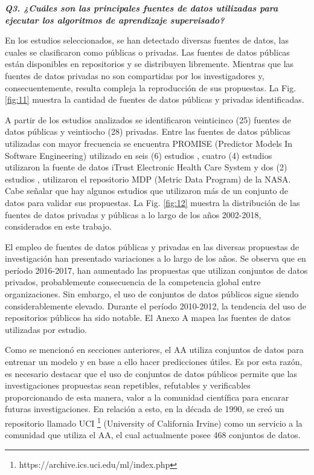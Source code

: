\documentclass[journal]{IEEEtran}
\begin{document}
\emph{\textbf{Q3. ¿Cuáles son las principales fuentes de datos utilizadas para ejecutar los algoritmos de aprendizaje supervisado?} } 

En los estudios seleccionados, se han detectado diversas fuentes de datos, las cuales se clasificaron como públicas o privadas. Las fuentes de datos públicas están disponibles en repositorios y se distribuyen libremente. Mientras que las fuentes de datos privadas no son compartidas por los investigadores y, consecuentemente, resulta compleja la reproducción de sus propuestas. La Fig. \ref{fig:11} muestra la cantidad de fuentes de datos públicas y privadas identificadas.

A partir de los estudios analizados se identificaron veinticinco (25) fuentes de datos públicas y veintiocho (28) privadas. Entre las fuentes de datos públicas utilizadas con mayor frecuencia se encuentra PROMISE (Predictor Models In Software Engineering) utilizado en seis (6) estudios \cite{Jindal20162027,dekhtyar2017re,abad2017works,Slankas2013,fitzgerald2012early,malhotra2017exploratory}, cuatro (4) estudios utilizaron la fuente de datos iTrust Electronic Health Care System \cite{Slankas2013,Slankas2013a,winkler2016automatic,sharma2014automated} y dos (2) estudios \cite{fitzgerald2012early}, \cite{malhotra2017exploratory} utilizaron el repositorio MDP (Metric Data Program) de la NASA. Cabe señalar que hay algunos estudios que utilizaron más de un conjunto de datos para validar sus propuestas. La Fig. \ref{fig:12} muestra la distribución de las fuentes de datos privadas y públicas a lo largo de los años 2002-2018, considerados en este trabajo.

El empleo de fuentes de datos públicas y privadas en las diversas propuestas de investigación han presentado variaciones a lo largo de los años. Se observa que en período 2016-2017, han aumentado las propuestas que utilizan conjuntos de datos privados, probablemente consecuencia de la competencia global entre organizaciones. Sin embargo, el uso de conjuntos de datos públicos sigue siendo considerablemente elevado. Durante el período 2010-2012, la tendencia del uso de repositorios públicos ha sido notable. El Anexo A mapea las fuentes de datos utilizadas por estudio.

Como se mencionó en secciones anteriores, el AA utiliza conjuntos de datos para entrenar un modelo y en base a ello hacer predicciones útiles. Es por esta razón, es necesario destacar que el uso de conjuntos de datos públicos permite que las investigaciones propuestas sean repetibles, refutables y verificables \cite{Catal2009} proporcionando de esta manera, valor a la comunidad científica para encarar futuras investigaciones. En relación a esto, en la década de 1990, se creó un repositorio llamado UCI \footnote{https://archive.ics.uci.edu/ml/index.php} (University of California Irvine) como un servicio a la comunidad que utiliza el AA, el cual actualmente posee 468 conjuntos de datos. 
\end{document}

